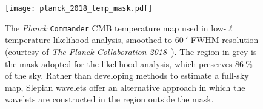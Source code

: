 \begin{figure}[htpb]
	\centering\capstart{}
	\texttt{[image: planck\_2018\_temp\_mask.pdf]}
	\caption[
		The 2018 \emph{Planck} CMB map with the \texttt{Commander} mask
	]{
		The \emph{Planck }\texttt{Commander} CMB temperature map used in low-\(\ell{}\) temperature likelihood analysis, smoothed to \(\SI{60}{\arcminute}\) FWHM resolution (courtesy of \emph{The Planck Collaboration 2018}~\cite{Planck2020a}).
		The region in grey is the mask adopted for the likelihood analysis, which preserves \(\SI{86}{\percent}\) of the sky.
		Rather than developing methods to estimate a full-sky map, Slepian wavelets offer an alternative approach in which the wavelets are constructed in the region outside the mask.
	}\label{fig:chapter2_planck_masked}
\end{figure}
